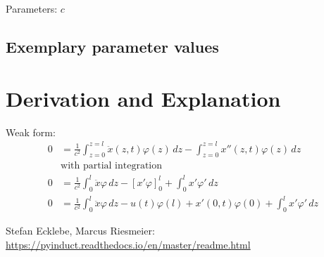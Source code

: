 \documentclass[10pt,a4paper]{article}
\begin{document}
	\noindent
	Parameters: $c$ %
	
	
	
	
	\subsection{Exemplary parameter values}
	

	
	\section{Derivation and Explanation} %
	Weak form:
	\begin{align*}
		0 &= \frac{1}{c^2} \int_{z=0}^{z=l} \ddot{x}(z,t)\varphi(z)\,dz - \int_{z=0}^{z=l} x''(z,t)\varphi(z)\,dz\\
		&\text{with partial integration}\\
		0 &= \frac{1}{c^2} \int_0^l \ddot{x}\varphi \,dz - [x'\varphi]_0^l +\int_0^l x'\varphi' \,dz\\
		0 &= \frac{1}{c^2} \int_0^l \ddot{x}\varphi \,dz - u(t)\varphi(l)+x'(0,t)\varphi(0) + \int_0^l x'\varphi' \,dz
	\end{align*}


	
	
	\begin{thebibliography}{10}		
		Stefan Ecklebe, Marcus Riesmeier: \\
		\href{https://pyinduct.readthedocs.io/en/master/readme.html}{https://pyinduct.readthedocs.io/en/master/readme.html}
	\end{thebibliography}
\end{document}
